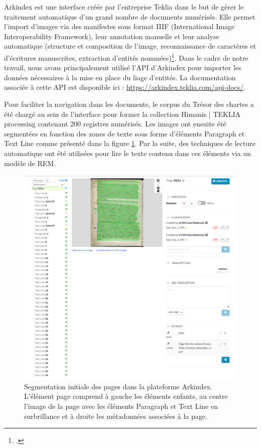 \documentclass[a4paper,12pt,twoside]{book}
\begin{document}
	Arkindex est une interface créée par l'entreprise Teklia dans le but de gérer le traitement automatique d'un grand nombre de documents numérisés. Elle permet l'import d'images via des manifestes sous format IIIF (International Image Interoperability Framework), leur annotation manuelle et leur analyse automatique (structure et composition de l'image, reconnaissance de caractères et d'écritures manuscrites, extraction d'entités nommées)\footcite{noauthor_teklia_nodate}. Dans le cadre de notre travail, nous avons principalement utilisé l'API d'Arkindex pour importer les données nécessaires à la mise en place du liage d'entités. La documentation associée à cette API est disponible ici : \url{https://arkindex.teklia.com/api-docs/}.
	
	Pour faciliter la navigation dans les documents, le corpus du Trésor des chartes a été chargé au sein de l'interface pour former la collection \og Himanis | TEKLIA processing\fg{} contenant 200 registres numérisés. Les images ont ensuite été segmentées en fonction des zones de texte sous forme d'éléments \og Paragraph\fg{} et \og Text Line\fg{} comme présenté dans la figure \ref{Page_Initiale_Arkindex}. Par la suite, des techniques de lecture automatique ont été utilisées pour lire le texte contenu dans ces éléments via un modèle de REM.
	
	\begin{figure}
		\centering
		\includegraphics[width=\textwidth]{Images/Interface_Arkindex.png}
		\caption{Segmentation initiale des pages dans la plateforme Arkindex. L'élément page comprend à gauche les éléments enfants, au centre l'image de la page avec les éléments \og Paragraph\fg{} et \og Text Line\fg{} en surbrillance et à droite les métadonnées associées à la page.}
		\label{Page_Initiale_Arkindex}
	\end{figure}
	
\end{document}

